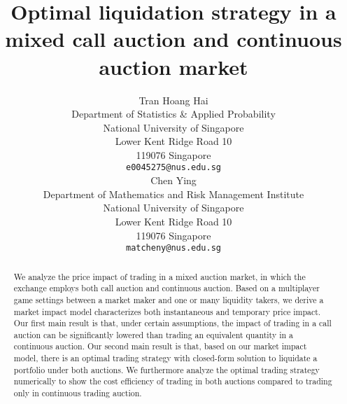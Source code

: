 \documentclass{article}
\title{Optimal liquidation strategy in a mixed call auction and continuous auction market}
\author{
 Tran Hoang Hai \\
 Department of Statistics \& Applied Probability\\
 National University of Singapore \\
 Lower Kent Ridge Road 10 \\
 119076 Singapore \\
 \texttt{e0045275@nus.edu.sg} \\
   \And
 Chen Ying \\
 Department of Mathematics and Risk Management Institute \\
 National University of Singapore \\
 Lower Kent Ridge Road 10 \\
 119076 Singapore \\
 \texttt{matcheny@nus.edu.sg} \\
}
\begin{document}
\maketitle

\begin{abstract}
We analyze the price impact of trading in a mixed auction market, in which the exchange employs both call auction and continuous auction. Based on a multiplayer game settings between a market maker and one or many liquidity takers, we derive a market impact model characterizes both instantaneous and temporary price impact. Our first main result is that, under certain assumptions, the impact of trading in a call auction can be significantly lowered than trading an equivalent quantity in a continuous auction. Our second main result is that, based on our market impact model, there is an optimal trading strategy with closed-form solution to liquidate a portfolio under both auctions. We furthermore analyze the optimal trading strategy numerically to show the cost efficiency of trading in both auctions compared to trading only in continuous trading auction.
\end{abstract}
\end{document}
